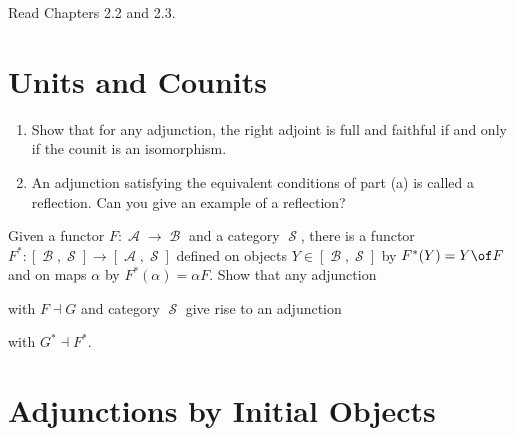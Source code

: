 \def\pathToRoot{../../}

\DeclareMathOperator{\A}{\mathscr A}
\DeclareMathOperator{\B}{\mathscr B}
\DeclareMathOperator{\M}{\mathscr M}
\DeclareMathOperator{\Sc}{\mathscr S}




\author{Mostafa Abouhamra}

\begin{hint}
Read Chapters 2.2 and 2.3.
\end{hint}

\section{Units and Counits}


\begin{exercise}
\begin{enumerate}
\item Show that for any adjunction, the right adjoint is full and faithful if and only if the counit is an isomorphism.
\item An adjunction satisfying the equivalent conditions of part (a) is called a reflection. Can you give an example of a reflection?
\end{enumerate}
\end{exercise}

\begin{exercise}
Given a functor $F: \A \rightarrow \B$ and a category $\Sc$, there is a functor $F^*: [\B,\Sc] \rightarrow [\A, \Sc]$ defined on objects $Y \in [\B,\Sc]$ by $F^*(Y) = Y \of F$ and on maps $\alpha$ by $F^*(\alpha) = \alpha F$. Show that any adjunction 
with  $F \dashv G$ and category $\Sc$ give rise to an adjunction 
with $G^* \dashv F^*$.
\end{exercise}

\section{Adjunctions by Initial Objects}

